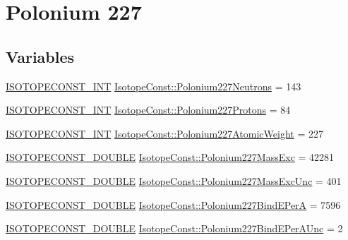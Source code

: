 \hypertarget{group___isotope_const-_polonium-_po227}{}\section{Polonium 227}
\label{group___isotope_const-_polonium-_po227}
\subsection*{Variables}
\begin{DoxyCompactItemize}
\item 
\mbox{\hyperlink{group___isotope_const-_macros_ga5f18360b3e99483a35c32d789e62621c}{I\+S\+O\+T\+O\+P\+E\+C\+O\+N\+S\+T\+\_\+\+I\+NT}} \mbox{\hyperlink{group___isotope_const-_polonium-_po227_ga0c8f30cb009f76c11064ecdaa5fd1ff6}{Isotope\+Const\+::\+Polonium227\+Neutrons}} = 143
\item 
\mbox{\hyperlink{group___isotope_const-_macros_ga5f18360b3e99483a35c32d789e62621c}{I\+S\+O\+T\+O\+P\+E\+C\+O\+N\+S\+T\+\_\+\+I\+NT}} \mbox{\hyperlink{group___isotope_const-_polonium-_po227_ga51ff064ee1ba780c00d66c9faa1dfcd2}{Isotope\+Const\+::\+Polonium227\+Protons}} = 84
\item 
\mbox{\hyperlink{group___isotope_const-_macros_ga5f18360b3e99483a35c32d789e62621c}{I\+S\+O\+T\+O\+P\+E\+C\+O\+N\+S\+T\+\_\+\+I\+NT}} \mbox{\hyperlink{group___isotope_const-_polonium-_po227_ga7f6dab608eda0953df2840e2904a7cc3}{Isotope\+Const\+::\+Polonium227\+Atomic\+Weight}} = 227
\item 
\mbox{\hyperlink{group___isotope_const-_macros_ga8f45a7272ce02c0b4c65c44636ed719a}{I\+S\+O\+T\+O\+P\+E\+C\+O\+N\+S\+T\+\_\+\+D\+O\+U\+B\+LE}} \mbox{\hyperlink{group___isotope_const-_polonium-_po227_gad9b3dd0f64051aaaa3c6b09e61564ab2}{Isotope\+Const\+::\+Polonium227\+Mass\+Exc}} = 42281
\item 
\mbox{\hyperlink{group___isotope_const-_macros_ga8f45a7272ce02c0b4c65c44636ed719a}{I\+S\+O\+T\+O\+P\+E\+C\+O\+N\+S\+T\+\_\+\+D\+O\+U\+B\+LE}} \mbox{\hyperlink{group___isotope_const-_polonium-_po227_ga30daaac9501cd42840ae8c02ab43d36a}{Isotope\+Const\+::\+Polonium227\+Mass\+Exc\+Unc}} = 401
\item 
\mbox{\hyperlink{group___isotope_const-_macros_ga8f45a7272ce02c0b4c65c44636ed719a}{I\+S\+O\+T\+O\+P\+E\+C\+O\+N\+S\+T\+\_\+\+D\+O\+U\+B\+LE}} \mbox{\hyperlink{group___isotope_const-_polonium-_po227_ga6d5a9628fa2e15d2aff128f9ca222269}{Isotope\+Const\+::\+Polonium227\+Bind\+E\+PerA}} = 7596
\item 
\mbox{\hyperlink{group___isotope_const-_macros_ga8f45a7272ce02c0b4c65c44636ed719a}{I\+S\+O\+T\+O\+P\+E\+C\+O\+N\+S\+T\+\_\+\+D\+O\+U\+B\+LE}} \mbox{\hyperlink{group___isotope_const-_polonium-_po227_ga0a84c617e474505cbf7cbb2947b7b306}{Isotope\+Const\+::\+Polonium227\+Bind\+E\+Per\+A\+Unc}} = 2

\end{DoxyCompactItemize}
